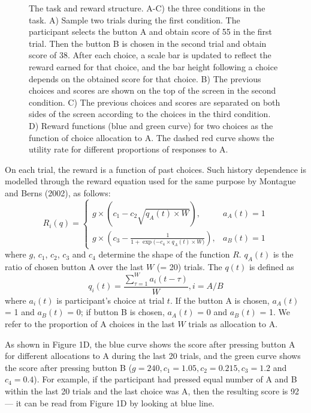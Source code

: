 \documentclass[twocolumn]{article}
\begin{document}
\begin{figure}[t!]
\caption{The task and reward structure. A-C) the three conditions in
  the task. A) Sample two trials during the first condition. The
  participant selects the button A and obtain score of 55 in the first
  trial. Then the button B is chosen in the second trial and obtain
  score of 38. After each choice, a scale bar is updated to reflect
  the reward earned for that choice, and the bar height following a
  choice depends on the obtained score for that choice. B) The
  previous choices and scores are shown on the top of the screen in
  the second condition. C) The previous choices and scores are
  separated on both sides of the screen according to the choices in
  the third condition. D) Reward functions (blue and green curve) for
  two choices as the function of choice allocation to A. The dashed
  red curve shows the utility rate for different proportions of
  responses to A.}
\end{figure}

On each trial, the reward is a function of past choices. Such history
dependence is modelled through the reward equation used for the same
purpose by Montague and Berns (2002), as follows:
\begin{equation}
R_i(q)= 
\begin{cases}
g \times (c_1-c_2\sqrt{q_A(t)\times W}),& a_A(t)=1 \\
g \times (c_3-\frac{1}{1+\exp{(-c_4\times q_A(t)\times W})}),& a_B(t)=1
\end{cases}
\end{equation}
where $g$, $c_1$, $c_2$, $c_3$ and $c_4$ determine the shape of the
function $R$. $q_A(t)$ is the ratio of chosen button A over the last
$W$ (= 20) trials. The $q(t)$ is defined as
\begin{equation}
q_i(t)=\frac{\sum_{\tau=1}^{W}a_i(t-\tau)}{W}, i=A/B
\end{equation}
where $a_i(t)$ is participant’s choice at trial $t$. If the button A
is chosen, $a_A(t)$ = 1 and $a_B(t)$ = 0; if button B is chosen,
$a_A(t)$ = 0 and $a_B(t)$ = 1. We refer to the proportion of A choices
in the last $W$ trials as allocation to A.

As shown in Figure 1D, the blue curve shows the score after pressing
button A for different allocations to A during the last 20 trials, and
the green curve shows the score after pressing button B
($g = 240, c_1 = 1.05, c_2 = 0.215, c_3 = 1.2$ and $c_4 = 0.4$). For
example, if the participant had pressed equal number of A and B within
the last 20 trials and the last choice was A, then the resulting score
is 92 --- it can be read from Figure 1D by looking at blue line.
\end{document}
